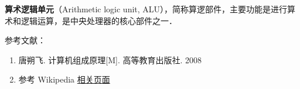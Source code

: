 
\begin{issues}
\issueDraft
\end{issues}

\textbf{算术逻辑单元}（Arithmetic logic unit, ALU），简称算逻部件，主要功能是进行算术和逻辑运算，是中央处理器的核心部件之一．

参考文献：
\begin{enumerate}
\item 唐朔飞. 计算机组成原理[M]. 高等教育出版社. 2008
\item 参考 Wikipedia \href{https://en.wikipedia.org/wiki/Arithmetic_logic_unit}{相关页面}
\end{enumerate}
